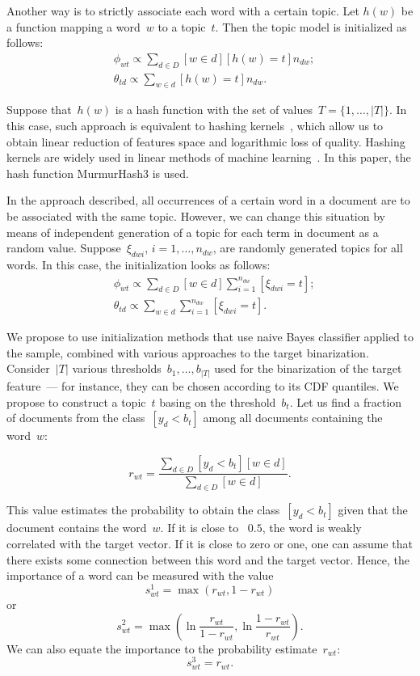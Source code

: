 \documentclass{sig-alternate-2013}
\begin{document}
Another way is to strictly associate each word with a certain topic.
Let $h(w)$ be a function mapping a word~$w$ to a topic~$t$.
Then the topic model is initialized as follows:
\begin{align*}
    &\phi_{wt}
    \propto
    \sum_{d \in D}
        [w \in d] [h(w) = t] n_{dw};\\
    &\theta_{td}
    \propto
    \sum_{w \in d}
        [h(w) = t] n_{dw}.
\end{align*}

Suppose that~$h(w)$ is a hash function with the set of values~$T = \{1, \dots, |T|\}$.
In this case, such approach is equivalent to hashing kernels~\cite{shi09hash},
which allow us to obtain linear reduction of features space and logarithmic loss of quality.
Hashing kernels are widely used in linear methods of machine learning~\cite{agarwal14vw}.
In this paper, the hash function MurmurHash3 is used.

In the approach described, all occurrences of a certain word
in a document are to be associated with the same topic.
However, we can change this situation by means of independent generation
of a topic for each term in document as a random value.
Suppose~$\xi_{dwi}$, $i = 1, \dots, n_{dw}$, are randomly generated topics for all words.
In this case, the initialization looks as follows:
\begin{align*}
    &\phi_{wt}
    \propto
    \sum_{d \in D}
        [w \in d]
        \sum_{i = 1}^{n_{dw}}
            [\xi_{dwi} = t];\\
    &\theta_{td}
    \propto
    \sum_{w \in d} \sum_{i = 1}^{n_{dw}}
        [\xi_{dwi} = t].
\end{align*}



We propose to use initialization methods that use naive Bayes classifier applied to the sample, combined with various approaches to the target binarization. Consider~$|T|$ various thresholds~$b_1, \dots, b_{|T|}$ used for the binarization of the target feature~--- for instance, they can be chosen according to its CDF quantiles. We propose to construct a topic~$t$ basing on the threshold~$b_t$.
Let us find a fraction of documents from the class~$[y_d < b_t]$ among all documents containing the word~$w$:

\[
    r_{wt}
    =
    \frac{
        \sum_{d \in D} [y_d < b_t] [w \in d]
    }{
        \sum_{d \in D} [w \in d]
    }.
\]

This value estimates the probability to obtain the class~$[y_d < b_t]$
given that the document contains the word~$w$. If it is close to ~$0.5$,
the word is weakly correlated with the target vector. If it is close to zero or one, one can assume that there exists some connection between this word and the target vector. Hence, the importance of a word can be measured with the value
\[
    s_{wt}^1
    =
    \max(r_{wt}, 1 - r_{wt})
\]
or
\[
    s_{wt}^2
    =
    \max \left(
        \ln \frac{r_{wt}}{1 - r_{wt}},
        \ln \frac{1 - r_{wt}}{r_{wt}}
    \right).
\]
We can also equate the importance to the probability estimate~$r_{wt}$:
\[
    s_{wt}^3
    =
    r_{wt}.
\]
\end{document}
